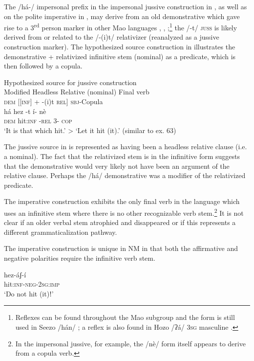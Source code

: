 \documentclass[output=paper]{langsci/langscibook}
\begin{document}
The /há-/ impersonal prefix in the impersonal jussive construction in , as well as on the polite imperative in , may derive from an old demonstrative which gave rise to a 3\textsuperscript{rd} person marker in other Mao languages \citep[206]{Bender2000}, \citep[245-246]{Ahland2012}, \citep{Ahland2015};\footnote{Reflexes can be found throughout the Mao subgroup and the form is still used in Seezo /hán/ \citep{Mengistu2015}; a reflex is also found in Hozo /ʔá/ \textsc{3sg} masculine \citep{Kassa2014}.} the /-t/ \textsc{juss} is likely derived from or related to the /-(i)t/ relativizer (reanalyzed as a jussive construction marker). The hypothesized source construction in  illustrates the demonstrative + relativized infinitive stem (nominal) as a predicate, which is then followed by a copula. 

\ea\label{ex:mahland:65}
Hypothesized source for jussive construction\\
Modified Headless Relative (nominal)  Final verb\\
\textsc{dem   [[inf}] + -(i)t \textsc{rel]}                \textsc{sbj-}Copula\\
\gll há  hez         {}-t                    í-   nè     \\
\textsc{dem}    hit\textsc{:inf}   \textsc{{}-rel}                3-   \textsc{cop}\\
\glt `It is that which hit.' {\textgreater} `Let it hit (it).' (similar to ex. 63)
\z

The jussive source in  is represented as having been a headless relative clause (i.e. a nominal). The fact that the relativized stem is in the infinitive form suggests that the demonstrative would very likely not have been an argument of the relative clause. Perhaps the /há/ demonstrative was a modifier of the relativized predicate.

The imperative construction exhibits the only final verb in the language which uses an infinitive stem where there is no other recognizable verb stem.\footnote{ In the impersonal jussive, for example, the /nè/ form itself appears to derive from a copula verb.} It is not clear if an older verbal stem atrophied and disappeared or if this represents a different grammaticalization pathway. 

The imperative construction  is unique in NM in that both the affirmative and negative polarities require the infinitive verb stem.  

\ea\label{ex:mahland:66}
\gll hez-áʃ-í\\
hit:\textsc{inf-neg-2sg:imp}\\
\glt `Do not hit (it)ǃ'
\z
\end{document}
